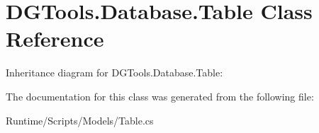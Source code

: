 \hypertarget{class_d_g_tools_1_1_database_1_1_table}{}\section{D\+G\+Tools.\+Database.\+Table Class Reference}
\label{class_d_g_tools_1_1_database_1_1_table}


Inheritance diagram for D\+G\+Tools.\+Database.\+Table\+:


The documentation for this class was generated from the following file\+:\begin{DoxyCompactItemize}
\item 
Runtime/\+Scripts/\+Models/Table.\+cs\end{DoxyCompactItemize}
